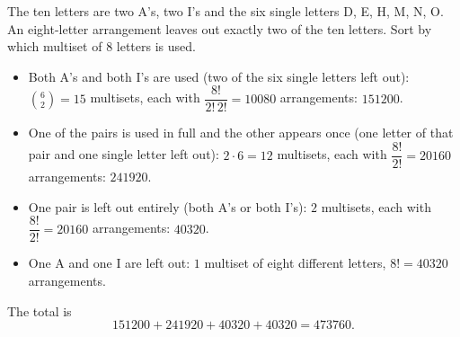 The ten letters are two A's, two I's and the six single letters D, E, H, M, N, O. An eight-letter arrangement leaves out exactly two of the ten letters. Sort by which multiset of $8$ letters is used.
\begin{itemize}
\item Both A's and both I's are used (two of the six single letters left out): $\binom{6}{2}=15$ multisets, each with $\dfrac{8!}{2!\,2!}=10080$ arrangements: $151200$.
\item One of the pairs is used in full and the other appears once (one letter of that pair and one single letter left out): $2\cdot6=12$ multisets, each with $\dfrac{8!}{2!}=20160$ arrangements: $241920$.
\item One pair is left out entirely (both A's or both I's): $2$ multisets, each with $\dfrac{8!}{2!}=20160$ arrangements: $40320$.
\item One A and one I are left out: $1$ multiset of eight different letters, $8!=40320$ arrangements.
\end{itemize}
The total is
\[
151200+241920+40320+40320=\boxed{473760}.
\]
